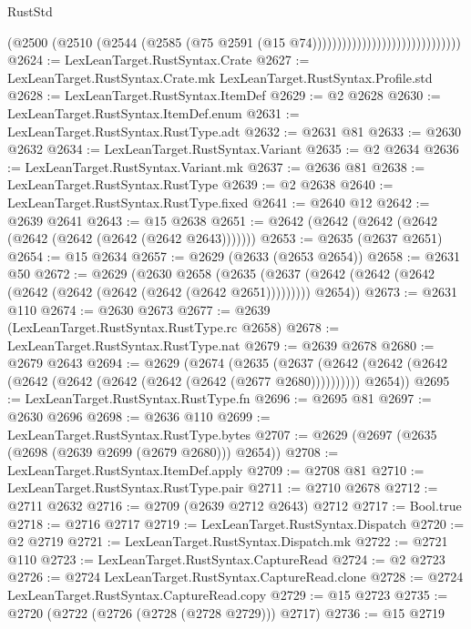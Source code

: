 \begin{lexlean}{RustStd}
\begin{coremodule}
                                                    (@2500
                                                      (@2510
                                                        (@2544
                                                          (@2585
                                                            (@75
                                                              @2591
                                                              (@15 @74))))))))))))))))))))))))))))))
@2624 := LexLeanTarget.RustSyntax.Crate
@2627 := LexLeanTarget.RustSyntax.Crate.mk LexLeanTarget.RustSyntax.Profile.std
@2628 := LexLeanTarget.RustSyntax.ItemDef
@2629 := @2 @2628
@2630 := LexLeanTarget.RustSyntax.ItemDef.enum
@2631 := LexLeanTarget.RustSyntax.RustType.adt
@2632 := @2631 @81
@2633 := @2630 @2632
@2634 := LexLeanTarget.RustSyntax.Variant
@2635 := @2 @2634
@2636 := LexLeanTarget.RustSyntax.Variant.mk
@2637 := @2636 @81
@2638 := LexLeanTarget.RustSyntax.RustType
@2639 := @2 @2638
@2640 := LexLeanTarget.RustSyntax.RustType.fixed
@2641 := @2640 @12
@2642 := @2639 @2641
@2643 := @15 @2638
@2651 := @2642 (@2642 (@2642 (@2642 (@2642 (@2642 (@2642 (@2642 @2643)))))))
@2653 := @2635 (@2637 @2651)
@2654 := @15 @2634
@2657 := @2629 (@2633 (@2653 @2654))
@2658 := @2631 @50
@2672 := @2629
    (@2630
      @2658
      (@2635 (@2637 (@2642 (@2642 (@2642 (@2642 (@2642 (@2642 (@2642 (@2642 @2651))))))))) @2654))
@2673 := @2631 @110
@2674 := @2630 @2673
@2677 := @2639 (LexLeanTarget.RustSyntax.RustType.rc @2658)
@2678 := LexLeanTarget.RustSyntax.RustType.nat
@2679 := @2639 @2678
@2680 := @2679 @2643
@2694 := @2629
    (@2674
      (@2635
        (@2637 (@2642 (@2642 (@2642 (@2642 (@2642 (@2642 (@2642 (@2642 (@2677 @2680))))))))))
        @2654))
@2695 := LexLeanTarget.RustSyntax.RustType.fn
@2696 := @2695 @81
@2697 := @2630 @2696
@2698 := @2636 @110
@2699 := LexLeanTarget.RustSyntax.RustType.bytes
@2707 := @2629 (@2697 (@2635 (@2698 (@2639 @2699 (@2679 @2680))) @2654))
@2708 := LexLeanTarget.RustSyntax.ItemDef.apply
@2709 := @2708 @81
@2710 := LexLeanTarget.RustSyntax.RustType.pair
@2711 := @2710 @2678
@2712 := @2711 @2632
@2716 := @2709 (@2639 @2712 @2643) @2712
@2717 := Bool.true
@2718 := @2716 @2717
@2719 := LexLeanTarget.RustSyntax.Dispatch
@2720 := @2 @2719
@2721 := LexLeanTarget.RustSyntax.Dispatch.mk
@2722 := @2721 @110
@2723 := LexLeanTarget.RustSyntax.CaptureRead
@2724 := @2 @2723
@2726 := @2724 LexLeanTarget.RustSyntax.CaptureRead.clone
@2728 := @2724 LexLeanTarget.RustSyntax.CaptureRead.copy
@2729 := @15 @2723
@2735 := @2720 (@2722 (@2726 (@2728 (@2728 @2729))) @2717)
@2736 := @15 @2719

\end{coremodule}
\end{lexlean}
